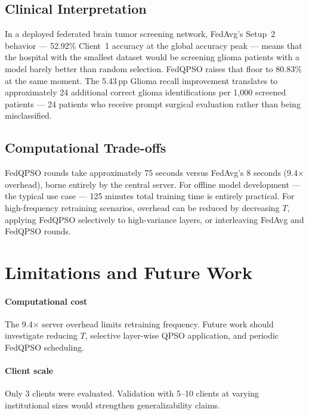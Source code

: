 \documentclass[conference]{IEEEtran}
\begin{document}
\subsection{Clinical Interpretation}
In a deployed federated brain tumor screening network, FedAvg's Setup~2
behavior — 52.92\% Client~1 accuracy at the global accuracy peak — means
that the hospital with the smallest dataset would be screening glioma
patients with a model barely better than random selection. FedQPSO raises
that floor to 80.83\% at the same moment. The 5.43\,pp Glioma recall
improvement translates to approximately 24 additional correct glioma
identifications per 1,000 screened patients — 24 patients who receive
prompt surgical evaluation rather than being misclassified.

\subsection{Computational Trade-offs}
FedQPSO rounds take approximately 75 seconds versus FedAvg's 8 seconds
(9.4$\times$ overhead), borne entirely by the central server. For offline
model development — the typical use case — 125 minutes total training time
is entirely practical. For high-frequency retraining scenarios, overhead
can be reduced by decreasing $T$, applying FedQPSO selectively to
high-variance layers, or interleaving FedAvg and FedQPSO rounds.

\section{Limitations and Future Work}
\label{sec:limitations}

\paragraph{Computational cost}
The 9.4$\times$ server overhead limits retraining frequency. Future work
should investigate reducing $T$, selective layer-wise QPSO application,
and periodic FedQPSO scheduling.

\paragraph{Client scale}
Only 3 clients were evaluated. Validation with 5--10 clients at varying
institutional sizes would strengthen generalizability claims.
\end{document}
